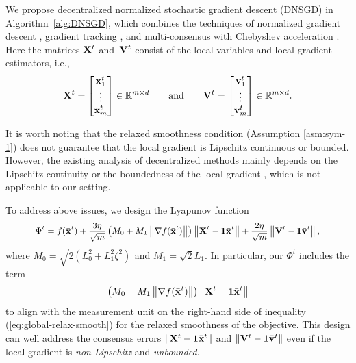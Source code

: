 \documentclass[sigconf]{acmart}
\newcommand{\Norm}[1]{\left\| #1 \right\|}
\def\vone{{\bf{1}}}
\def\vv{{\bf{v}}}
\def\vx{{\bf{x}}}
\def\mV {{\bf V}}
\def\mX {{\bf X}}
\theoremstyle{plain}
\def\bx{{\bar\vx}}
\def\bv{{\bar\vv}}
\begin{document}
We propose decentralized normalized stochastic gradient
descent (DNSGD) in Algorithm~\ref{alg:DNSGD}, which combines the techniques of normalized gradient descent \citep{mandic2004generalized,chen2023generalized,li2024problem,hazan2015beyond,fang2018spider}, gradient tracking \citep{nedic2017achieving,qu2017harnessing}, and multi-consensus with Chebyshev acceleration \citep{scaman2017optimal,hendrikx2021optimal,ye2023multi}.
Here the matrices $\mX^t$ and~$\mV^t$ consist of the local variables and local gradient estimators, i.e.,
\begin{align*}
\mX^t = \begin{bmatrix}
    \vx_1^t \\ \vdots \\ \vx_m^t
\end{bmatrix}\in\mathbb{R}^{m \times d}    
\qquad\text{and}\qquad
\mV^t = \begin{bmatrix}
    \vv_1^t \\ \vdots \\ \vv_m^t
\end{bmatrix}\in\mathbb{R}^{m \times d}.
\end{align*}


It is worth noting that the relaxed 
smoothness condition (Assumption \ref{asm:sym-1}) does not guarantee that the local gradient is Lipschitz continuous or bounded.
However, the existing analysis of decentralized methods mainly depends on the Lipschitz continuity or the boundedness of the local gradient \citep{song2024optimal,xin2020general,hendrikx2021optimal,li2022variance,metelev2024decentralized,liu2024decentralized,luo2022complexity,ye2023multi,bai2024complexity,yuan2022revisiting,lu2021optimal,lan2020communication,kovalev2024lower,lin2023decentralized,sahinoglu2024online,li2024problem}, which is not applicable to our setting.  

To address above issues, we design the Lyapunov function
\begin{align*}
\small\begin{split}    
\Phi^t=  f(\bx^t) + \frac{3\eta}{\sqrt{m}}\left(M_0 + M_1\Norm{\nabla f(\bx^t)}\right)\Norm{\mX^t-\vone\bx^t} + \frac{2\eta}{\sqrt{m}}\Norm{\mV^t-\vone\bv^t},
\end{split}
\end{align*}
where $M_0=\sqrt{2(L_0^2 +L_1^2\zeta^2)}$ and $M_1=\sqrt{2}L_1$.
In particular, our $\Phi^t$ includes the term 
\begin{align*}
    \left(M_0 + M_1\Norm{\nabla f(\bx^t)}\right)\Norm{\mX^t-\vone\bx^t}
\end{align*}
to align with the measurement unit on the right-hand side of inequality (\ref{eq:global-relax-smooth}) for the relaxed smoothness of the objective.
This design can well address the consensus errors $\Norm{\mX^t-\vone\bx^t}$ and $\Norm{\mV^t-\vone\bv^t}$ even if the local gradient is \textit{non-Lipschitz} and \textit{unbounded}. 
\end{document}
